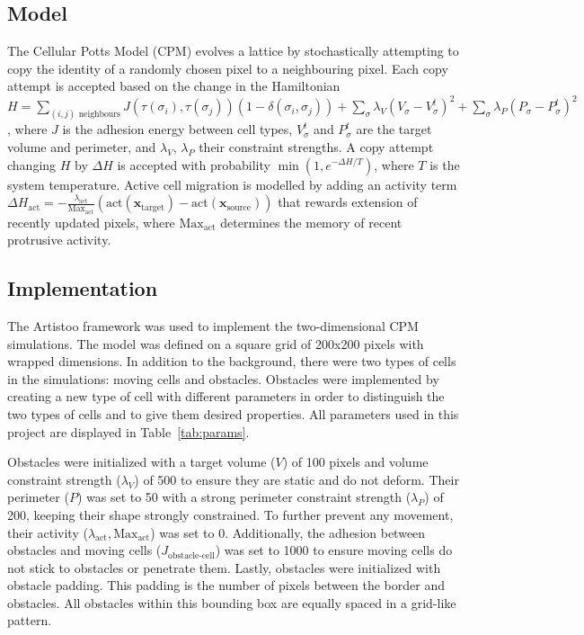 \documentclass{article}
\begin{document}
\subsection*{Model}
The Cellular Potts Model (CPM) \cite{graner1992} evolves a lattice by stochastically attempting to copy the identity of a randomly chosen pixel to a neighbouring pixel. Each copy attempt is accepted based on the change in the Hamiltonian $H = \sum_{(i,j)\text{ neighbours}} J(\tau(\sigma_i),\tau(\sigma_j))(1 - \delta(\sigma_i, \sigma_j)) + \sum_{\sigma} \lambda_V (V_\sigma - V_\sigma^t)^2 + \sum_{\sigma} \lambda_P (P_\sigma - P_\sigma^t)^2$, where $J$ is the adhesion energy between cell types, $V_\sigma^t$ and $P_\sigma^t$ are the target volume and perimeter, and $\lambda_V$, $\lambda_P$ their constraint strengths. A copy attempt changing $H$ by $\Delta H$ is accepted with probability $\min(1, e^{-\Delta H / T})$, where $T$ is the system temperature. Active cell migration is modelled by adding an activity term $\Delta H_{\text{act}} = -\frac{\lambda_{\text{act}}}{\text{Max}_{\text{act}}} ( \text{act}(\mathbf{x}_{\text{target}}) - \text{act}(\mathbf{x}_{\text{source}}) )$ that rewards extension of recently updated pixels, where $\text{Max}_{\text{act}}$ determines the memory of recent protrusive activity.

\subsection*{Implementation}
The Artistoo framework \cite{wortel2021} was used to implement the two-dimensional CPM simulations. The model was defined on a square grid of 200x200 pixels with wrapped dimensions. In addition to the background, there were two types of cells in the simulations: moving cells and obstacles. Obstacles were implemented by creating a new type of cell with different parameters in order to distinguish the two types of cells and to give them desired properties. All parameters used in this project are displayed in Table~\ref{tab:params}.

Obstacles were initialized with a target volume ($V$) of 100 pixels and volume constraint strength ($\lambda_V$) of 500 to ensure they
are static and do not deform. Their perimeter ($P$) was set to 50 with a strong perimeter constraint strength ($\lambda_P$) of 200, keeping their shape strongly constrained. To further prevent any movement, their activity ($\lambda_{\text{act}}, \text{Max}_{\text{act}}$) was set to 0. Additionally, the adhesion between obstacles and moving cells ($J_{\text{obstacle-cell}}$) was set to 1000 to ensure moving cells do not stick to obstacles or penetrate them. Lastly, obstacles were initialized with obstacle padding. This padding is the number of pixels between the border and obstacles. All obstacles within this bounding box are equally spaced in a grid-like pattern.
\end{document}
